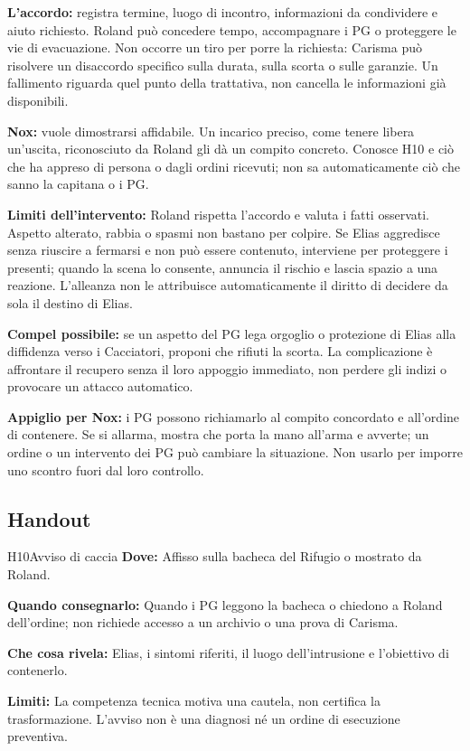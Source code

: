 \documentclass[11pt,a4paper]{article}
\begin{document}
\textbf{L'accordo:} registra termine, luogo di incontro, informazioni da condividere e aiuto richiesto. Roland può concedere tempo, accompagnare i PG o proteggere le vie di evacuazione. Non occorre un tiro per porre la richiesta: Carisma può risolvere un disaccordo specifico sulla durata, sulla scorta o sulle garanzie. Un fallimento riguarda quel punto della trattativa, non cancella le informazioni già disponibili.

\textbf{Nox:} vuole dimostrarsi affidabile. Un incarico preciso, come tenere libera un'uscita, riconosciuto da Roland gli dà un compito concreto. Conosce H10 e ciò che ha appreso di persona o dagli ordini ricevuti; non sa automaticamente ciò che sanno la capitana o i PG.

\textbf{Limiti dell'intervento:} Roland rispetta l'accordo e valuta i fatti osservati. Aspetto alterato, rabbia o spasmi non bastano per colpire. Se Elias aggredisce senza riuscire a fermarsi e non può essere contenuto, interviene per proteggere i presenti; quando la scena lo consente, annuncia il rischio e lascia spazio a una reazione. L'alleanza non le attribuisce automaticamente il diritto di decidere da sola il destino di Elias.

\begin{fatebox}
\textbf{Compel possibile:} se un aspetto del PG lega orgoglio o protezione di Elias alla diffidenza verso i Cacciatori, proponi che rifiuti la scorta. La complicazione è affrontare il recupero senza il loro appoggio immediato, non perdere gli indizi o provocare un attacco automatico.

\textbf{Appiglio per Nox:} i PG possono richiamarlo al compito concordato e all'ordine di contenere. Se si allarma, mostra che porta la mano all'arma e avverte; un ordine o un intervento dei PG può cambiare la situazione. Non usarlo per imporre uno scontro fuori dal loro controllo.
\end{fatebox}

\subsection{Handout}
\label{nodo-5-handout}
{}
\begin{handoutbox}{H10}{Avviso di caccia}
\textbf{Dove:} Affisso sulla bacheca del Rifugio o mostrato da Roland.

\textbf{Quando consegnarlo:} Quando i PG leggono la bacheca o chiedono a Roland dell'ordine; non richiede accesso a un archivio o una prova di Carisma.

\textbf{Che cosa rivela:} Elias, i sintomi riferiti, il luogo dell'intrusione e l'obiettivo di contenerlo.

\textbf{Limiti:} La competenza tecnica motiva una cautela, non certifica la trasformazione. L'avviso non è una diagnosi né un ordine di esecuzione preventiva.
\end{handoutbox}
\end{document}

